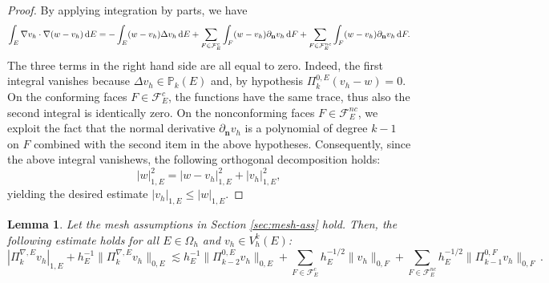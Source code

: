 \documentclass[a4paper,11pt]{article}
\newtheorem{lemma}[theorem]{Lemma}
\theoremstyle{remark}
\theoremstyle{definition}
\newcommand{\PiNablaE}{\Pi^{\nabla,E}_k}
\begin{document}
\begin{proof}
By applying integration by parts, we have
\[
\int_E \nabla v_h \cdot \nabla (w - v_h) \, {\rm d} E = 
-\int_E (w - v_h) \Delta v_h \, {\rm d} E + \sum_{F \in \mathcal{F}^c_E} \int_F (w - v_h) \partial_\mathbf{n} v_h \, {\rm d}F + \sum_{F \in \mathcal{F}^{nc}_E} \int_F (w - v_h) \partial_\mathbf{n} v_h \, {\rm d}F.
\]
The three terms in the right hand side are all equal to zero.
Indeed, the first integral vanishes because $\Delta v_h \in \mathbb{P}_{k}(E)$ and, by hypothesis $\Pi_{k}^{0,E}(v_h - w) = 0$.
On the conforming faces $F \in \mathcal{F}^c_E$, the functions have the same trace, thus also the second integral is identically zero. On the nonconforming faces $F \in \mathcal{F}^{nc}_E$, we exploit the fact that the normal derivative $\partial_\mathbf{n} v_h$ is a polynomial of degree $k-1$ on $F$ combined with the second item in the above hypotheses.
Consequently, since the above integral vanishews, the following orthogonal decomposition holds:
\[
| w |^2_{1,E} = | w - v_h |^2_{1,E} + | v_h |^2_{1,E},
\]
yielding the desired estimate $| v_h |_{1,E} \leq | w |_{1,E}$.
\end{proof}

\begin{lemma}\label{lm:PiNabla_stability}
Let the mesh assumptions in Section \ref{sec:mesh-ass} hold. 
Then, the following estimate holds for all $E \in \Omega_h$ and $v_h \in V_h^k(E)$:
\begin{equation}\label{eq:H1_estimate}
| \PiNablaE v_h |_{1,E} + h_E^{-1} \| \PiNablaE v_h \|_{0,E}  
\lesssim
h_E^{-1} \| \Pi^{0,E}_{k-2} v_h \|_{0,E}
+ \sum_{F \in \mathcal{F}^{c}_E} h_E^{-1/2} \| v_h \|_{0,F}
+ \sum_{F \in \mathcal{F}^{nc}_E} h_E^{-1/2} \| \Pi^{0,F}_{k-1} v_h \|_{0,F} \, .
\end{equation}
\end{lemma}
\end{document}
